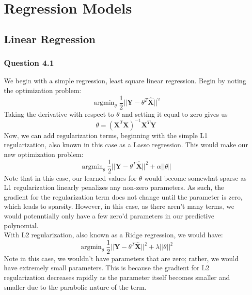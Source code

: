 \documentclass[11pt,letterpaper]{article}
\DeclareMathOperator*{\argmin}{argmin}
\begin{document}
\section*{Regression Models}
\subsection*{Linear Regression}
\subsubsection*{Question 4.1}
We begin with a simple regression, least square linear regression. Begin by 
noting the optimization problem:
\begin{equation}
    \argmin_{\theta} \dfrac{1}{2}||\textbf{Y}-\theta^T\hat{\textbf{X}}||^2
\end{equation}
Taking the derivative with respect to $\theta$ and setting it equal to zero 
gives us 
\begin{equation}
\theta = \left(\textbf{X}^T\textbf{X}\right)^{-1}\textbf{X}^T\textbf{Y}
\end{equation}
Now, we can add regularization terms, beginning with the simple L1 
regularization, also known in this case as a Lasso regression. This would make 
our new optimization problem:
\begin{equation}
    \argmin_{\theta} \dfrac{1}{2}||\textbf{Y}-\theta^T\hat{\textbf{X}}||^2 + 
    \alpha ||\theta||
\end{equation}
Note that in this case, our learned values for $\theta$ would become somewhat 
sparse as L1 regularization linearly penalizes any non-zero parameters.
As such, the gradient for the regularization term does not change until the 
parameter is zero, which leads to sparsity. However, in this case, as there 
aren't many terms, we would potenntially only have a few zero'd parameters in 
our predictive polynomial. \\

With L2 regularization, also known as a Ridge regression, we would have:
\begin{equation}
    \argmin_{\theta} \dfrac{1}{2}||\textbf{Y}-\theta^T\hat{\textbf{X}}||^2 + 
    \lambda ||\theta||^2
\end{equation}
Note in this case, we wouldn't have parameters that are zero; rather, we would 
have extremely small parameters. This is because the gradient for L2 
regularization decreases rapidly as the parameter itself becomes smaller and 
smaller due to the parabolic nature of the term. 



\end{document}
